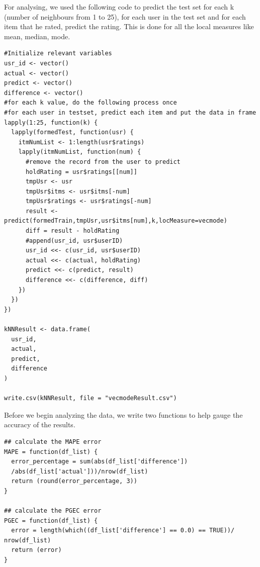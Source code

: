 \documentclass{article}
\begin{document}
For analysing, we used the following code to predict the test set for each k (number of neighbours from 1 to 25), for each user in the test set and for each item that he rated, predict the rating. This is done for all the local measures like mean, median, mode.

\begin{verbatim}
#Initialize relevant variables
usr_id <- vector()
actual <- vector()
predict <- vector()
difference <- vector()
#for each k value, do the following process once
#for each user in testset, predict each item and put the data in frame
lapply(1:25, function(k) {
  lapply(formedTest, function(usr) {
    itmNumList <- 1:length(usr$ratings)
    lapply(itmNumList, function(num) {
      #remove the record from the user to predict
      holdRating = usr$ratings[[num]] 
      tmpUsr <- usr
      tmpUsr$itms <- usr$itms[-num] 
      tmpUsr$ratings <- usr$ratings[-num] 
      result <- predict(formedTrain,tmpUsr,usr$itms[num],k,locMeasure=vecmode)
      diff = result - holdRating
      #append(usr_id, usr$userID)
      usr_id <<- c(usr_id, usr$userID)
      actual <<- c(actual, holdRating)
      predict <<- c(predict, result)
      difference <<- c(difference, diff)
    })
  })
}) 

kNNResult <- data.frame(
  usr_id,
  actual,
  predict,
  difference
)

write.csv(kNNResult, file = "vecmodeResult.csv")
\end{verbatim}

Before we begin analyzing the data, we write two functions to help gauge the accuracy of the results. 
\begin{verbatim}
## calculate the MAPE error
MAPE = function(df_list) {
  error_percentage = sum(abs(df_list['difference'])
  /abs(df_list['actual']))/nrow(df_list) 
  return (round(error_percentage, 3))
}

## calculate the PGEC error
PGEC = function(df_list) {
  error = length(which((df_list['difference'] == 0.0) == TRUE))/ nrow(df_list)
  return (error)
}
\end{verbatim}
\end{document}
